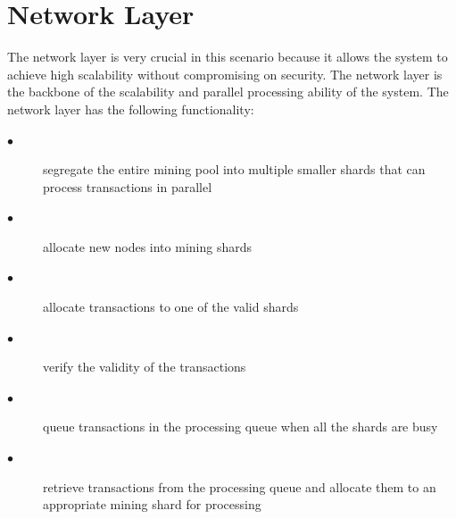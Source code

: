 \documentclass[a4paper,twoside,phd]{BYUPhys}
\begin{document}
\section{Network Layer}
The network layer is very crucial in this scenario because it allows the system to achieve high scalability without compromising on security. The network layer is the backbone of the scalability and parallel processing ability of the system. The network layer has the following functionality:
\begin{description}
\item[$\bullet$] segregate the entire mining pool into multiple smaller shards that can process transactions in parallel
\item[$\bullet$] allocate new nodes into mining shards
\item[$\bullet$] allocate transactions to one of the valid shards
\item[$\bullet$] verify the validity of the transactions 
\item[$\bullet$] queue transactions in the processing queue when all the shards are busy
\item[$\bullet$] retrieve transactions from the processing queue and allocate them to an appropriate mining shard for processing
\end{description}
\end{document}
